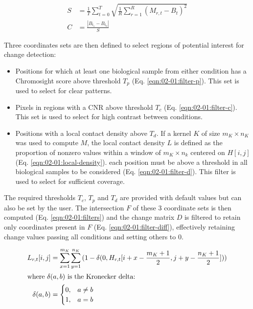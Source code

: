 \begin{align}
    \label{eqn:02-01:pareidolia-se}
    S &= \frac{1}{T}\sum_{t=0}^T{\sqrt{\frac{1}{R}\sum_{r=1}^R{(M_{r, t} - B_t)^2}}} \\
    \label{eqn:02-01:pareidolia-cnr}
    C   &= \frac{\left|B_{t_1} - B_{t_0}\right|}{S}
\end{align}

Three coordinates sets are then defined to select regions of potential interest for change detection:
\begin{itemize}
    \item Positions for which at least one biological sample from either condition has a Chromosight score above threshold $T_p$ (Eq. \ref{eqn:02-01:filter-p}). This set is used to select for clear patterns.
    \item Pixels in regions with a \acrshort{CNR} above threshold $T_c$ (Eq. \ref{eqn:02-01:filter-c}). This set is used to select for high contrast between conditions.
    \item Positions with a local contact density above $T_d$. If a kernel $K$ of size $m_K \times n_K$ was used to compute $M$, the local contact density $L$ is defined as the proportion of nonzero values within a window of $m_K \times n_k$ centered on $H[i, j]$ (Eq. \ref{eqn:02-01:local-density}). each position must be above a threshold in all biological samples to be considered (Eq. \ref{eqn:02-01:filter-d}). This filter is used to select for sufficient coverage.
\end{itemize}

The required thresholds $T_c$, $T_p$ and $T_d$ are provided with default values but can also be set by the user. The intersection $F$ of these 3 coordinate sets is then computed (Eq. \ref{eqn:02-01:filters}) and the change matrix $D$ is filtered to retain only coordinates present in $F$ (Eq. \ref{eqn:02-01:filter-diff}), effectively retaining change values passing all conditions and setting others to 0.

\begin{align}
    \label{eqn:02-01:local-density}
    L_{r,t}[i, j] &= \sum_{x=1}^{m_K} {\sum_{y=1}^{n_K}{(1 - \delta(0, H_{r, t}[i+x - \frac{m_K+1}{2}, j+y-\frac{n_K+1}{2}]))}} \\
    \intertext{where $\delta(a, b)$ is the Kronecker delta:}
    \delta(a, b) &= \begin{cases} \nonumber
        0, & a \neq b \\
        1,  & a = b \\
    \end{cases}
\end{align}


